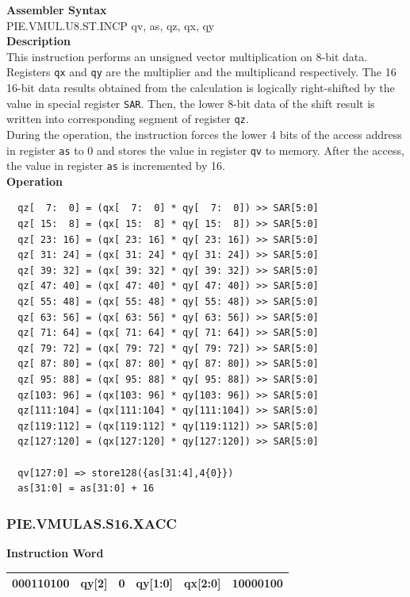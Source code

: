 \textbf{Assembler Syntax} \\
PIE.VMUL.U8.ST.INCP qv, as, qz, qx, qy \\
\textbf{Description} \\
This instruction performs an unsigned vector multiplication on 8-bit data. Registers \lstinline{qx} and \lstinline{qy} are the multiplier and the multiplicand respectively. The 16 16-bit data results obtained from the calculation is logically right-shifted by the value in special register \lstinline{SAR}. Then, the lower 8-bit data of the shift result is written into corresponding segment of register \lstinline{qz}. \\ During the operation, the instruction forces the lower 4 bits of the access address in register \lstinline{as} to 0 and stores the value in register \lstinline{qv} to memory. After the access, the value in register \lstinline{as} is incremented by 16.\\
\textbf{Operation}
\begin{lstlisting}
  qz[  7:  0] = (qx[  7:  0] * qy[  7:  0]) >> SAR[5:0]
  qz[ 15:  8] = (qx[ 15:  8] * qy[ 15:  8]) >> SAR[5:0]
  qz[ 23: 16] = (qx[ 23: 16] * qy[ 23: 16]) >> SAR[5:0]
  qz[ 31: 24] = (qx[ 31: 24] * qy[ 31: 24]) >> SAR[5:0]
  qz[ 39: 32] = (qx[ 39: 32] * qy[ 39: 32]) >> SAR[5:0]
  qz[ 47: 40] = (qx[ 47: 40] * qy[ 47: 40]) >> SAR[5:0]
  qz[ 55: 48] = (qx[ 55: 48] * qy[ 55: 48]) >> SAR[5:0]
  qz[ 63: 56] = (qx[ 63: 56] * qy[ 63: 56]) >> SAR[5:0]
  qz[ 71: 64] = (qx[ 71: 64] * qy[ 71: 64]) >> SAR[5:0]
  qz[ 79: 72] = (qx[ 79: 72] * qy[ 79: 72]) >> SAR[5:0]
  qz[ 87: 80] = (qx[ 87: 80] * qy[ 87: 80]) >> SAR[5:0]
  qz[ 95: 88] = (qx[ 95: 88] * qy[ 95: 88]) >> SAR[5:0]
  qz[103: 96] = (qx[103: 96] * qy[103: 96]) >> SAR[5:0]
  qz[111:104] = (qx[111:104] * qy[111:104]) >> SAR[5:0]
  qz[119:112] = (qx[119:112] * qy[119:112]) >> SAR[5:0]
  qz[127:120] = (qx[127:120] * qy[127:120]) >> SAR[5:0]

  qv[127:0] => store128({as[31:4],4{0}})
  as[31:0] = as[31:0] + 16
\end{lstlisting}

\newpage
\subsubsection{PIE.VMULAS.S16.XACC}\label{instruction:PIEVMULASS16XACC}
\setlength\tabcolsep{6pt}
\textbf{Instruction Word} \\
\begin{tabular}{|c|c|c|c|c|c|}
	\hline
	000110100 & qy[2] & 0 & qy[1:0] & qx[2:0] & 10000100 \\
	\hline
\end{tabular}

